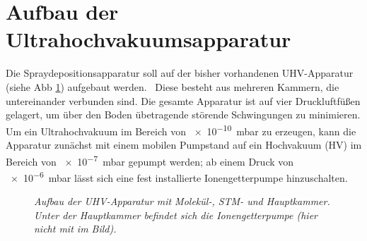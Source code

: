\section{Aufbau der Ultrahochvakuumsapparatur}\label{kapaufbau}

Die Spraydepositionsapparatur soll auf der bisher vorhandenen UHV-Apparatur (siehe Abb
\ref{uhvaufbau}) aufgebaut werden.~%
 Diese besteht aus mehreren Kammern, die untereinander verbunden sind. Die gesamte Apparatur ist
auf vier Druckluftfüßen gelagert, um über den Boden übetragende störende Schwingungen zu minimieren. Um ein
Ultrahochvakuum im Bereich von \SI{e-10}{mbar} zu erzeugen, kann die Apparatur zunächst mit einem
mobilen Pumpstand %
auf ein Hochvakuum (HV) im Bereich von
\SI{e-7}{mbar} gepumpt werden; ab einem Druck von \SI{e-6}{mbar} lässt sich eine fest installierte
Ionengetterpumpe hinzuschalten.

\begin{figure}[H]
\centering
\sffamily

\caption{\textit{Aufbau der UHV-Apparatur mit Molekül-, STM- und Hauptkammer. Unter der
Hauptkammer befindet sich die Ionengetterpumpe (hier nicht mit im Bild).}}
\label{uhvaufbau}
\end{figure}

